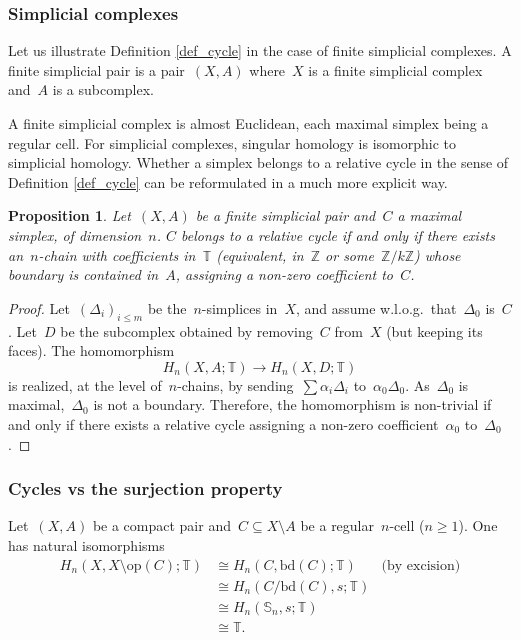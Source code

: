 \documentclass[english,11pt]{article}
\theoremstyle{plain}
\newtheorem{proposition}{Proposition}[section]
\theoremstyle{remark}
\theoremstyle{definition}
\newcommand{\bd}[1]{\mathrm{bd}(#1)}
\newcommand{\op}[1]{\mathrm{op}(#1)}
\newcommand{\Sp}{\mathbb{S}}
\newcommand{\R}{\mathbb{R}}
\newcommand{\Z}{\mathbb{Z}}
\newcommand{\RZ}{\mathbb{T}}%
\begin{document}
\subsubsection{Simplicial complexes}
Let us illustrate Definition \ref{def_cycle} in the case of finite simplicial complexes. A finite simplicial pair is a pair~$(X,A)$ where~$X$ is a finite simplicial complex and~$A$ is a subcomplex.

A finite simplicial complex is almost Euclidean, each maximal simplex being a regular cell. For simplicial complexes, singular homology is isomorphic to simplicial homology. Whether a simplex belongs to a relative cycle in the sense of Definition \ref{def_cycle} can be reformulated in a much more explicit way.


\begin{proposition}\label{prop_cycle_simplicial}
Let~$(X,A)$ be a finite simplicial pair and~$C$ a maximal simplex, of dimension~$n$. $C$ belongs to a relative cycle if and only if there exists an~$n$-chain with coefficients in~$\RZ$ (equivalent, in~$\Z$ or some~$\Z/k\Z$) whose boundary is contained in~$A$, assigning a non-zero coefficient to~$C$.
\end{proposition}
\begin{proof}

Let~$(\Delta_i)_{i\leq m}$ be the~$n$-simplices in~$X$, and assume w.l.o.g.~that~$\Delta_0$ is~$C$. Let~$D$ be the subcomplex obtained by removing~$C$ from~$X$ (but keeping its faces). The homomorphism
\begin{equation*}
H_n(X,A;\RZ)\to H_n(X,D;\RZ)
\end{equation*}
 is realized, at the level of~$n$-chains, by sending~$\sum \alpha_i\Delta_i$ to~$\alpha_0\Delta_0$. As~$\Delta_0$ is maximal,~$\Delta_0$ is not a boundary. Therefore, the homomorphism is non-trivial if and only if there exists a relative cycle assigning a non-zero coefficient~$\alpha_0$ to~$\Delta_0$.%
\end{proof}

\subsubsection{Cycles vs the surjection property}
Let~$(X,A)$ be a compact pair and~$C\subseteq X\setminus A$ be a regular~$n$-cell ($n\geq 1$). One has natural isomorphisms
\begin{align*}
H_n(X,X\setminus \op{C};\RZ)&\cong H_n(C,\bd{C};\RZ)&\text{(by excision)}\\
&\cong H_n(C/\bd{C},s;\RZ)\\
&\cong H_n(\Sp_n,s;\RZ)\\
&\cong \RZ.
\end{align*}
\end{document}
